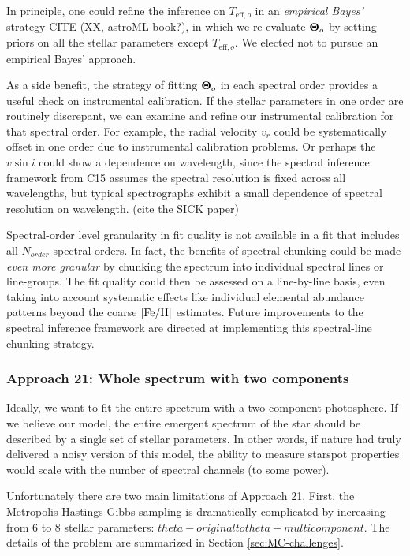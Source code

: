 \documentclass[onecolumn]{emulateapj}%
\newcommand{\iancze}{{\sc C15 }}
\begin{document}
In principle, one could refine the inference on $T_{\mathrm{eff},o}$ in an \emph{empirical Bayes'} strategy CITE (XX, astroML book?), in which we re-evaluate ${\bm \Theta}_o$ by setting priors on all the stellar parameters except $T_{\mathrm{eff},o}$.  We elected not to pursue an empirical Bayes' approach.

As a side benefit, the strategy of fitting ${\bm \Theta}_o$ in each spectral order provides a useful check on instrumental calibration. If the stellar parameters in one order are routinely discrepant, we can examine and refine our instrumental calibration for that spectral order.  For example, the radial velocity $v_r$ could be systematically offset in one order due to instrumental calibration problems.  Or perhaps the $v\sin{i}$ could show a dependence on wavelength, since the spectral inference framework from \iancze assumes the spectral resolution is fixed across all wavelengths, but typical spectrographs exhibit a small dependence of spectral resolution on wavelength.  (cite the SICK paper)

Spectral-order level granularity in fit quality is not available in a fit that includes all $N_{order}$ spectral orders.  In fact, the benefits of spectral chunking could be made \emph{even more granular} by chunking the spectrum into individual spectral lines or line-groups.  The fit quality could then be assessed on a line-by-line basis, even taking into account systematic effects like individual elemental abundance patterns beyond the coarse $[{\rm Fe}/{\rm H}]$ estimates.  Future improvements to the spectral inference framework are directed at implementing this spectral-line chunking strategy.  

\subsubsection{Approach 21: Whole spectrum with two components}

Ideally, we want to fit the entire spectrum with a two component photosphere.  If we believe our model, the entire emergent spectrum of the star should be described by a single set of stellar parameters.  In other words, if nature had truly delivered a noisy version of this model, the ability to measure starspot properties would scale with the number of spectral channels (to some power).

Unfortunately there are two main limitations of Approach 21.  First, the Metropolis-Hastings Gibbs sampling is dramatically complicated by increasing from 6 to 8 stellar parameters: $theta-original to theta-multicomponent$.  The details of the problem are summarized in Section \ref{sec:MC-challenges}.
\end{document}
